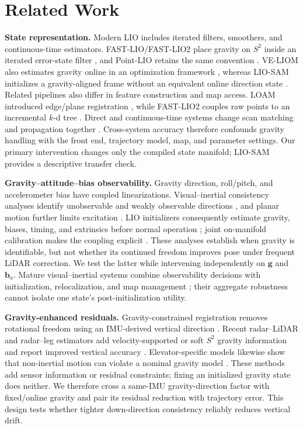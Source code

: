 \section{Related Work}
\label{sec:related}

\textbf{State representation.}
Modern LIO includes iterated filters, smoothers, and continuous-time
estimators. FAST-LIO/FAST-LIO2 place gravity on $S^2$ inside an iterated
error-state filter \cite{xu2021fastlio,xu2022fastlio2,he2021ikfom}, and
Point-LIO retains the same convention \cite{he2023pointlio}. VE-LIOM also
estimates gravity online in an optimization framework \cite{gao2024veliom},
whereas LIO-SAM initializes a gravity-aligned frame without an equivalent
online direction state \cite{shan2020liosam}. Related pipelines also differ in
feature construction and map access. LOAM introduced edge/plane registration
\cite{zhang2014loam}, while FAST-LIO2 couples raw points to an incremental
$k$-d tree \cite{cai2021ikdtree}. Direct and continuous-time systems change
scan matching and propagation together
\cite{wang2023dliom,nguyen2023slict,chen2023dlio}. Cross-system accuracy
therefore confounds gravity handling with the front end, trajectory model,
map, and parameter settings. Our primary intervention changes only the compiled state
manifold; LIO-SAM provides a descriptive transfer check.

\textbf{Gravity--attitude--bias observability.}
Gravity direction, roll/pitch, and accelerometer bias have coupled
linearizations. Visual--inertial consistency analyses identify unobservable
and weakly observable directions \cite{hesch2014consistency,qin2018vinsmono},
and planar motion further limits excitation \cite{wu2017vinswheels}. LIO
initializers consequently estimate gravity, biases, timing, and extrinsics
before normal operation \cite{zhu2022liinit}; joint on-manifold calibration
makes the coupling explicit \cite{nemiroff2023gravity}. These analyses
establish when gravity is identifiable, but not whether its continued freedom
improves pose under frequent LiDAR correction. We test the latter while
intervening independently on $\mathbf g$ and $\mathbf b_a$. Mature
visual--inertial systems combine observability decisions with initialization,
relocalization, and map management \cite{campos2021orbslam3}; their aggregate
robustness cannot isolate one state's post-initialization utility.

\textbf{Gravity-enhanced residuals.}
Gravity-constrained registration removes rotational freedom using an
IMU-derived vertical direction \cite{kubelka2022gravity}. Recent radar--LiDAR
and radar--leg estimators add velocity-supported or soft $S^2$ gravity
information and report improved vertical accuracy
\cite{noh2025garlio,noh2025garlileo}. Elevator-specific models likewise show
that non-inertial motion can violate a nominal gravity model
\cite{elevator2026lio}. These methods add sensor information or residual
constraints; fixing an initialized gravity state does neither. We therefore
cross a same-IMU gravity-direction factor with fixed/online gravity and pair
its residual reduction with trajectory error. This design tests whether
tighter down-direction consistency reliably reduces vertical drift.

